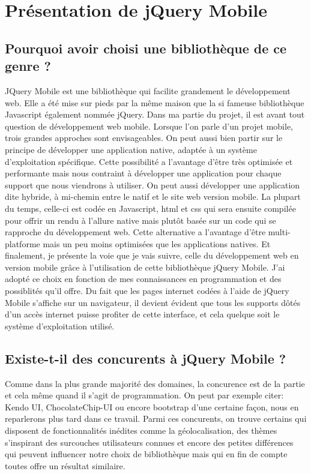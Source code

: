 \documentclass[a4paper,12pt,oneside]{sphinxmanual}
\begin{document}
\chapter{Présentation de jQuery Mobile}
\label{presentation_jQM::doc}\label{presentation_jQM:presentation-de-jquery-mobile}

\section{Pourquoi avoir choisi une bibliothèque de ce genre ?}
\label{presentation_jQM:pourquoi-avoir-choisi-une-bibliotheque-de-ce-genre}
JQuery Mobile est une bibliothèque qui facilite grandement le développement web.
Elle a été mise sur pieds par la même maison que la si fameuse bibliothèque
Javascript également nommée jQuery. Dans ma partie du projet, il est avant tout
question de développement web mobile. Lorsque l'on parle d'un projet mobile, trois
grandes approches sont envisageables. On peut aussi bien partir sur le principe
de développer une application native, adaptée à un système d'exploitation spécifique.
Cette possibilité a l'avantage d'être très optimisée et performante mais nous
contraint à développer une application pour chaque support que nous viendrons
à utiliser. On peut aussi développer une application dite hybride, à mi-chemin entre le natif et
le site web version mobile. La plupart du temps, celle-ci est codée en Javascript,
html et css qui sera ensuite compilée pour offrir un rendu à l'allure native mais
plutôt basée sur un code qui se rapproche du développement web. Cette alternative
a l'avantage d'être multi-platforme mais un peu moins optimisées que les
applications natives. Et finalement, je présente la voie que je vais suivre,
celle du développement web en version mobile grâce à l'utilisation de cette
bibliothèque jQuery Mobile. J'ai adopté ce choix en fonction de mes connaissances
en programmation et des possiblités qu'il offre. Du fait que les pages internet
codées à l'aide de jQuery Mobile s'affiche sur un navigateur, il devient
évident que tous les supports dôtés d'un accès internet puisse profiter de cette interface,
et cela quelque soit le système d'exploitation utilisé.


\section{Existe-t-il des concurents à jQuery Mobile ?}
\label{presentation_jQM:existe-t-il-des-concurents-a-jquery-mobile}
Comme dans la plus grande majorité des domaines, la concurence est de
la partie et cela même quand il s'agit de programmation. On peut par exemple citer:
Kendo UI, ChocolateChip-UI ou encore bootstrap d'une certaine façon, nous en
reparlerons plus tard dans ce travail. Parmi ces concurents, on trouve certains
qui disposent de fonctionnalités inédites comme la géolocalisation, des thèmes
s'inspirant des surcouches utilisateurs connues et encore des petites différences
qui peuvent influencer notre choix de bibliothèque mais qui en fin de compte
toutes offre un résultat similaire.
\end{document}
